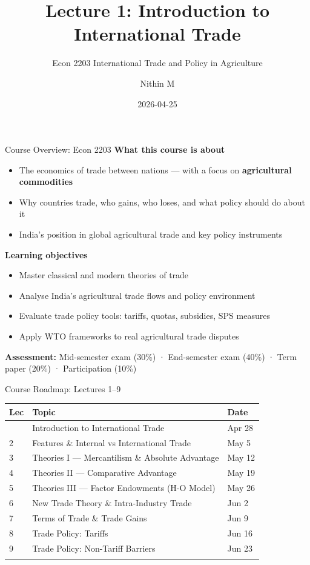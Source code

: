 \documentclass[
  ignorenonframetext,
  aspectratio=169,
]{beamer}
\title[L1 \textbar{} Introduction to International Trade]{Lecture 1:
Introduction to International Trade}
\subtitle{Econ 2203 \textbar{} International Trade and Policy in
Agriculture}
\author{Nithin M}
\date{2026-04-25}
\institute{Department of Development Economics}
\makeatletter
\providecommand{\tightlist}{%
  \setlength{\itemsep}{0pt}\setlength{\parskip}{0pt}}
\let\quarto@originallabel\label
\DeclareRobustCommand*{\label}[1]{\quarto@originallabel{#1}}
\makeatother
\begin{document}
\frame{\titlepage}


\begin{frame}{Course Overview: Econ 2203}
\label{course-overview-econ-2203}
\textbf{What this course is about}

\begin{itemize}
\tightlist
\item
  The economics of trade between nations --- with a focus on
  \textbf{agricultural commodities}
\item
  Why countries trade, who gains, who loses, and what policy should do
  about it
\item
  India's position in global agricultural trade and key policy
  instruments
\end{itemize}

\textbf{Learning objectives}

\begin{itemize}
\tightlist
\item
  Master classical and modern theories of trade
\item
  Analyse India's agricultural trade flows and policy environment
\item
  Evaluate trade policy tools: tariffs, quotas, subsidies, SPS measures
\item
  Apply WTO frameworks to real agricultural trade disputes
\end{itemize}

\textbf{Assessment:} Mid-semester exam (30\%) · End-semester exam (40\%)
· Term paper (20\%) · Participation (10\%)
\end{frame}

\begin{frame}{Course Roadmap: Lectures 1--9}
\label{course-roadmap-lectures-19}
\begin{longtable}[]{@{}lll@{}}
\toprule\noalign{}
Lec & Topic & Date \\
\midrule\noalign{}
\endhead
1 & Introduction to International Trade & Apr 28 \\
2 & Features \& Internal vs International Trade & May 5 \\
3 & Theories I --- Mercantilism \& Absolute Advantage & May 12 \\
4 & Theories II --- Comparative Advantage & May 19 \\
5 & Theories III --- Factor Endowments (H-O Model) & May 26 \\
6 & New Trade Theory \& Intra-Industry Trade & Jun 2 \\
7 & Terms of Trade \& Trade Gains & Jun 9 \\
8 & Trade Policy: Tariffs & Jun 16 \\
9 & Trade Policy: Non-Tariff Barriers & Jun 23 \\
\bottomrule\noalign{}
\end{longtable}
\end{frame}
\end{document}
